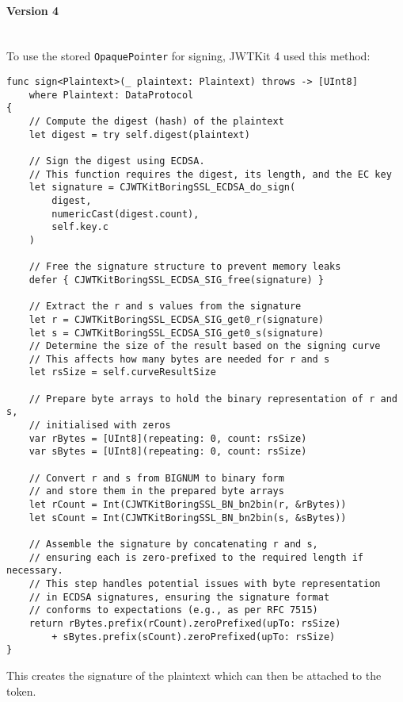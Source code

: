 \paragraph{Version 4} \mbox{} \\
To use the stored \lstinline{OpaquePointer} for signing, JWTKit 4 used this method:
\begin{verbatim}
func sign<Plaintext>(_ plaintext: Plaintext) throws -> [UInt8]
    where Plaintext: DataProtocol
{
    // Compute the digest (hash) of the plaintext
    let digest = try self.digest(plaintext)

    // Sign the digest using ECDSA. 
    // This function requires the digest, its length, and the EC key
    let signature = CJWTKitBoringSSL_ECDSA_do_sign(
        digest,
        numericCast(digest.count),
        self.key.c
    )
    
    // Free the signature structure to prevent memory leaks
    defer { CJWTKitBoringSSL_ECDSA_SIG_free(signature) }

    // Extract the r and s values from the signature
    let r = CJWTKitBoringSSL_ECDSA_SIG_get0_r(signature)
    let s = CJWTKitBoringSSL_ECDSA_SIG_get0_s(signature)
    // Determine the size of the result based on the signing curve
    // This affects how many bytes are needed for r and s
    let rsSize = self.curveResultSize

    // Prepare byte arrays to hold the binary representation of r and s, 
    // initialised with zeros
    var rBytes = [UInt8](repeating: 0, count: rsSize)
    var sBytes = [UInt8](repeating: 0, count: rsSize)

    // Convert r and s from BIGNUM to binary form 
    // and store them in the prepared byte arrays
    let rCount = Int(CJWTKitBoringSSL_BN_bn2bin(r, &rBytes))
    let sCount = Int(CJWTKitBoringSSL_BN_bn2bin(s, &sBytes))

    // Assemble the signature by concatenating r and s, 
    // ensuring each is zero-prefixed to the required length if necessary.
    // This step handles potential issues with byte representation 
    // in ECDSA signatures, ensuring the signature format 
    // conforms to expectations (e.g., as per RFC 7515)
    return rBytes.prefix(rCount).zeroPrefixed(upTo: rsSize)
        + sBytes.prefix(sCount).zeroPrefixed(upTo: rsSize)
}
\end{verbatim}
This creates the signature of the plaintext which can then be attached to the token. \cite{jwtkit-4}

